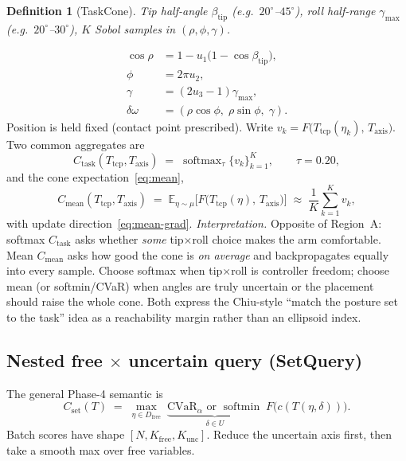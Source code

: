 \documentclass[11pt,a4paper]{article}
\newtheorem{definition}{Definition}
\newcommand{\Tcp}{T_{\mathrm{tcp}}}
\newcommand{\Taxis}{T_{\mathrm{axis}}}
\newcommand{\softmin}{\operatorname{softmin}}
\newcommand{\softmax}{\operatorname{softmax}}
\newcommand{\CVaR}{\mathrm{CVaR}}
\begin{document}
\begin{definition}[TaskCone]
Tip half-angle \(\beta_{\mathrm{tip}}\) (e.g.\ \(20^{\circ}\)--\(45^{\circ}\)),
roll half-range \(\gamma_{\max}\) (e.g.\ \(20^{\circ}\)--\(30^{\circ}\)),
\(K\) Sobol samples in \((\rho,\phi,\gamma)\).
\end{definition}
\begin{equation}
\label{eq:task-cone-sample}
\begin{aligned}
  \cos\rho
  &=
  1-u_{1}\bigl(1-\cos\beta_{\mathrm{tip}}\bigr),
  \\
  \phi
  &=
  2\pi u_{2},
  \\
  \gamma
  &=
  (2u_{3}-1)\gamma_{\max},
  \\
  \delta\omega
  &=
  (\rho\cos\phi,\;\rho\sin\phi,\;\gamma).
\end{aligned}
\end{equation}
Position is held fixed (contact point prescribed). Write
\(v_{k}=F\bigl(\Tcp(\eta_{k}),\,\Taxis\bigr)\). Two common aggregates are
\begin{equation}
\label{eq:task-cone}
  C_{\mathrm{task}}(\Tcp,\Taxis)
  \;=\;
  \softmax_{\tau}
  \{v_{k}\}_{k=1}^{K},
  \qquad
  \tau=0.20,
\end{equation}
and the cone expectation~\eqref{eq:mean},
\begin{equation}
\label{eq:task-cone-mean}
  C_{\mathrm{mean}}(\Tcp,\Taxis)
  \;=\;
  \mathbb{E}_{\eta\sim\mu}
  \bigl[
    F\bigl(\Tcp(\eta),\,\Taxis\bigr)
  \bigr]
  \;\approx\;
  \frac{1}{K}\sum_{k=1}^{K} v_{k},
\end{equation}
with update direction~\eqref{eq:mean-grad}.
\emph{Interpretation.}
Opposite of Region~A: softmax \(C_{\mathrm{task}}\) asks whether \emph{some}
tip$\times$roll choice makes the arm comfortable. Mean \(C_{\mathrm{mean}}\)
asks how good the cone is \emph{on average} and backpropagates equally into
every sample. Choose softmax when tip$\times$roll is controller freedom;
choose mean (or softmin/CVaR) when angles are truly uncertain or the
placement should raise the whole cone. Both express the Chiu-style
``match the posture set to the task'' idea as a reachability margin rather
than an ellipsoid index.

\subsection{Nested free \(\times\) uncertain query (SetQuery)}
\label{sec:set-query}

The general Phase-4 semantic is
\begin{equation}
\label{eq:nested-semantic}
  C_{\mathrm{set}}(T)
  \;=\;
  \max_{\eta\in D_{\mathrm{free}}}
  \;
  \underbrace{
    \CVaR_{\alpha}\text{ or }\softmin
  }_{\delta\in U}
  \;
  F\bigl(c(T(\eta,\delta))\bigr).
\end{equation}
Batch scores have shape \([N,K_{\mathrm{free}},K_{\mathrm{unc}}]\).
Reduce the uncertain axis first, then take a smooth max over free variables.
\end{document}
